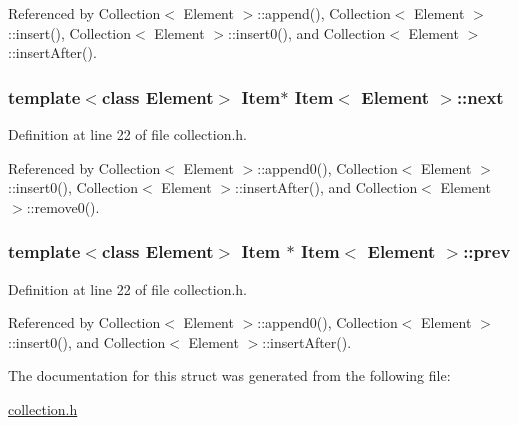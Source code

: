 Referenced by Collection$<$ Element $>$::append(), Collection$<$ Element $>$::insert(), Collection$<$ Element $>$::insert0(), and Collection$<$ Element $>$::insertAfter().\hypertarget{structItem_d71a5dc5b6a7540dd2bcda1f7764f000}{
\subsubsection[{next}]{\setlength{\rightskip}{0pt plus 5cm}template$<$class Element$>$ {\bf Item}$\ast$ {\bf Item}$<$ Element $>$::{\bf next}}}
\label{structItem_d71a5dc5b6a7540dd2bcda1f7764f000}




Definition at line 22 of file collection.h.

Referenced by Collection$<$ Element $>$::append0(), Collection$<$ Element $>$::insert0(), Collection$<$ Element $>$::insertAfter(), and Collection$<$ Element $>$::remove0().\hypertarget{structItem_37e220e71e790749d0d61993d7e9524f}{
\subsubsection[{prev}]{\setlength{\rightskip}{0pt plus 5cm}template$<$class Element$>$ {\bf Item} $\ast$ {\bf Item}$<$ Element $>$::{\bf prev}}}
\label{structItem_37e220e71e790749d0d61993d7e9524f}




Definition at line 22 of file collection.h.

Referenced by Collection$<$ Element $>$::append0(), Collection$<$ Element $>$::insert0(), and Collection$<$ Element $>$::insertAfter().

The documentation for this struct was generated from the following file:\begin{CompactItemize}
\item 
\hyperlink{collection_8h}{collection.h}\end{CompactItemize}
